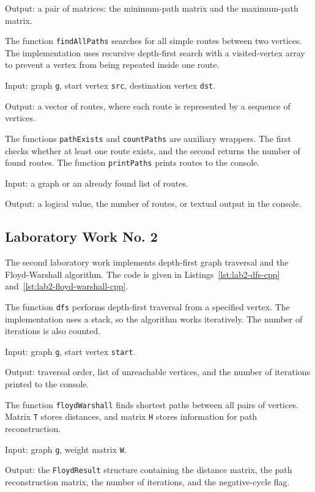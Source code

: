 \documentclass[a4paper,final]{article}
\begin{document}
Output: a pair of matrices: the minimum-path matrix and the maximum-path matrix.

The function \texttt{findAllPaths} searches for all simple routes between two vertices. The implementation uses recursive depth-first search with a visited-vertex array to prevent a vertex from being repeated inside one route.

Input: graph \texttt{g}, start vertex \texttt{src}, destination vertex \texttt{dst}.

Output: a vector of routes, where each route is represented by a sequence of vertices.

The functions \texttt{pathExists} and \texttt{countPaths} are auxiliary wrappers. The first checks whether at least one route exists, and the second returns the number of found routes. The function \texttt{printPaths} prints routes to the console.

Input: a graph or an already found list of routes.

Output: a logical value, the number of routes, or textual output in the console.

\subsection{Laboratory Work No. 2}

The second laboratory work implements depth-first graph traversal and the Floyd-Warshall algorithm. The code is given in Listings~\ref{lst:lab2-dfs-cpp} and~\ref{lst:lab2-floyd-warshall-cpp}.

The function \texttt{dfs} performs depth-first traversal from a specified vertex. The implementation uses a stack, so the algorithm works iteratively. The number of iterations is also counted.

Input: graph \texttt{g}, start vertex \texttt{start}.

Output: traversal order, list of unreachable vertices, and the number of iterations printed to the console.

The function \texttt{floydWarshall} finds shortest paths between all pairs of vertices. Matrix \texttt{T} stores distances, and matrix \texttt{H} stores information for path reconstruction.

Input: graph \texttt{g}, weight matrix \texttt{W}.

Output: the \texttt{FloydResult} structure containing the distance matrix, the path reconstruction matrix, the number of iterations, and the negative-cycle flag.
\end{document}
